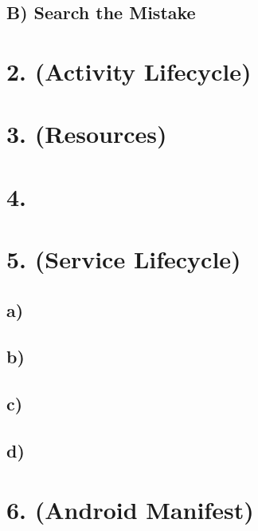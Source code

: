 \documentclass[10pt,a4paper]{report}
\begin{document}
				
		\subsection*{B) Search the Mistake}
		
	\section*{2. (Activity Lifecycle)}
	
	\section*{3. (Resources)}
	
	\section*{4.}
	
	\section*{5. (Service Lifecycle)}
		\subsection*{a)}
		
		\subsection*{b)}
		
		\subsection*{c)}
		
		\subsection*{d)}
	
	\section*{6. (Android Manifest)}
	
	
\end{document}
